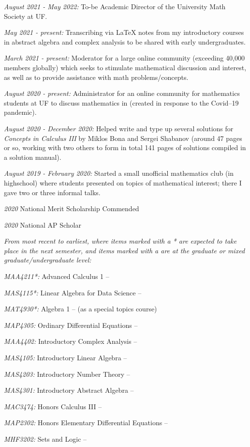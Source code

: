 \documentclass[11pt]{article}
\begin{document}
\noindent{}

\textsl{August 2021 - May 2022:} To-be Academic Director of the University Math Society at UF.

\textsl{May 2021 - present:} Transcribing via \LaTeX\hspace{1pt} notes from my introductory courses in abstract algebra and complex analysis to be shared with early undergraduates.

\textsl{March 2021 - present:} Moderator for a large online community (exceeding 40,000 members globally) which seeks to stimulate mathematical discussion and interest, as well as to provide assistance with math problems/concepts.

\textsl{August 2020 - present:} Administrator for an online community for mathematics students at UF to discuss mathematics in (created in response to the Covid--19 pandemic).

\textsl{August 2020 - December 2020:} Helped write and type up several solutions for \textsl{Concepts in Calculus
III} by Miklos Bona and Sergei Shabanov (around 47 pages or so, working with two others to form in total 141 pages of solutions compiled in a solution manual).

\textsl{August 2019 - February 2020:} Started a small unofficial mathematics club (in highschool) where students presented on topics of mathematical interest; there I gave two or three informal talks.

\noindent{}

\textsl{2020} National Merit Scholarship Commended

\textsl{2020} National AP Scholar

\noindent{}

\textsl{From most recent to earliest, where items marked with a * are expected to take place in the next semester, and items marked with a \textsuperscript{\textdagger} are at the graduate or mixed graduate/undergraduate level:}

\textsl{MAA4211*:} Advanced Calculus 1 --

\textsl{MAS4115*:} Linear Algebra for Data Science --

\textsl{MAT4930*\textsuperscript{\textdagger}:} Algebra 1 -- (as a special topics course)

\textsl{MAP4305:} Ordinary Differential Equations --

\textsl{MAA4402:} Introductory Complex Analysis --

\textsl{MAS4105:} Introductory Linear Algebra --

\textsl{MAS4203:} Introductory Number Theory --

\textsl{MAS4301:} Introductory Abstract Algebra --

\textsl{MAC3474:} Honors Calculus III --

\textsl{MAP2302:} Honors Elementary Differential Equations --

\textsl{MHF3202:} Sets and Logic --
\end{document}
